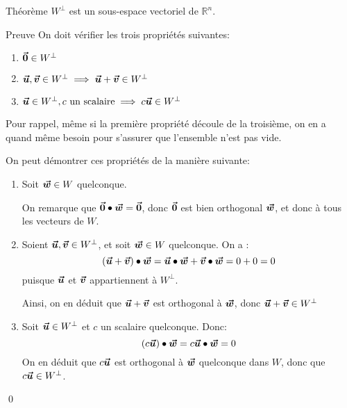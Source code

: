 \documentclass[a4paper]{article}
\begin{document}
\begin{parag}{Théorème}
    $W^{\perp}$ est un sous-espace vectoriel de $\mathbb{R}^n$.

    \begin{subparag}{Preuve}
        On doit vérifier les trois propriétés suivantes:
        \begin{enumerate}
            \item $\bm{\protect\vec{0}} \in W^{\perp}$
            \item $\bm{\protect\vec{u}}, \bm{\protect\vec{v}} \in W^{\perp} \implies \bm{\protect\vec{u}} + \bm{\protect\vec{v}} \in W^{\perp}$
            \item $\bm{\protect\vec{u}} \in W^{\perp}, c \text{ un scalaire} \implies c \bm{\protect\vec{u}} \in W^{\perp}$
        \end{enumerate}
        
        Pour rappel, même si la première propriété découle de la troisième, on en a quand même besoin pour s'assurer que l'ensemble n'est pas vide.

        On peut démontrer ces propriétés de la manière suivante:
        \begin{enumerate}
            \item Soit $\bm{\protect\vec{w}} \in W$ quelconque. 

            On remarque que $\bm{\protect\vec{0}} \bullet \bm{\protect\vec{w}} = \bm{\protect\vec{0}}$, donc $\bm{\protect\vec{0}}$ est bien orthogonal $\bm{\protect\vec{w}}$, et donc à tous les vecteurs de $W$.
            
            \item Soient $\bm{\protect\vec{u}}, \bm{\protect\vec{v}} \in W^{\perp}$, et soit $\bm{\protect\vec{w}} \in W$ quelconque. On a : 
            \[\left(\bvec{u} + \bvec{v}\right) \dotprod \bvec{w} = \bvec{u} \dotprod \bvec{w} + \bvec{v} \dotprod \bvec{w}  = 0 + 0 = 0\]
            puisque $\bm{\protect\vec{u}}$ et $\bm{\protect\vec{v}}$ appartiennent à $W^{\perp}$.

            Ainsi, on en déduit que $\bm{\protect\vec{u}} + \bm{\protect\vec{v}}$ est orthogonal à $\bm{\protect\vec{w}}$, donc $\bm{\protect\vec{u}} + \bm{\protect\vec{v}} \in W^{\perp}$
                
        \item Soit $\bm{\protect\vec{u}} \in W^{\perp}$ et $c$ un scalaire quelconque. Donc: 
                \[\left(c \bvec{u}\right) \dotprod \bvec{w} = c \bvec{u} \dotprod \bvec{w} = 0\]
            On en déduit que $c \bm{\protect\vec{u}}$ est orthogonal à $\bm{\protect\vec{w}}$ quelconque dans $W$, donc que $c \bm{\protect\vec{u}} \in W^{\perp}$.
        \end{enumerate}

        \qed
    \end{subparag}
\end{parag}
\end{document}
